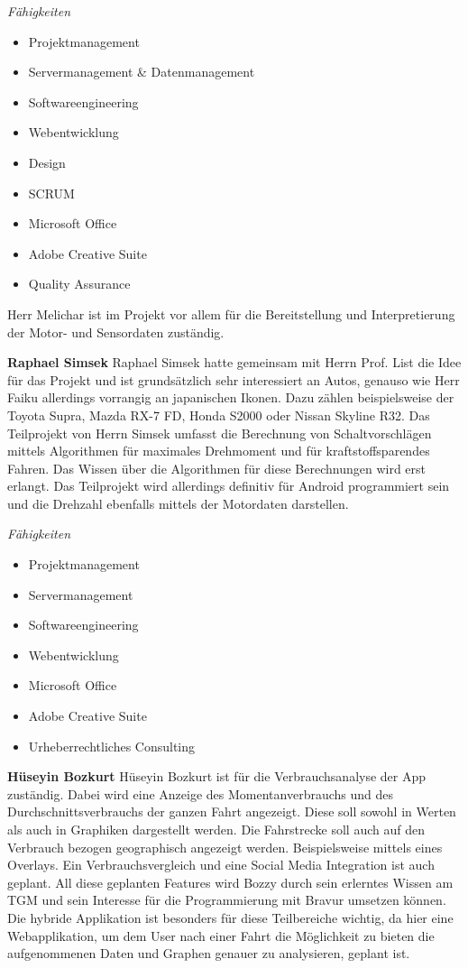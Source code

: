\textit{Fähigkeiten}
\begin{itemize}
	\item Projektmanagement
	\item Servermanagement & Datenmanagement				
	\item Softwareengineering
	\item Webentwicklung
	\item Design
	\item SCRUM
	\item Microsoft Office
	\item Adobe Creative Suite
	\item Quality Assurance
\end{itemize}
Herr Melichar ist im Projekt vor allem für die Bereitstellung und Interpretierung der Motor- und Sensordaten zuständig. 


\textbf{Raphael Simsek}
Raphael Simsek hatte gemeinsam mit Herrn Prof. List die Idee für das Projekt und ist grundsätzlich sehr interessiert an Autos, genauso wie Herr Faiku allerdings vorrangig an japanischen Ikonen. Dazu zählen beispielsweise der Toyota Supra, Mazda RX-7 FD, Honda S2000 oder Nissan Skyline R32. Das Teilprojekt von Herrn Simsek umfasst die Berechnung von Schaltvorschlägen mittels Algorithmen für maximales Drehmoment und für kraftstoffsparendes Fahren. Das Wissen über die Algorithmen für diese Berechnungen wird erst erlangt. Das Teilprojekt wird allerdings definitiv für Android programmiert sein und die Drehzahl ebenfalls mittels der Motordaten darstellen.

\textit{Fähigkeiten}
\begin{itemize}
	\item Projektmanagement
	\item Servermanagement				
	\item Softwareengineering
	\item Webentwicklung
	\item Microsoft Office
	\item Adobe Creative Suite
	\item Urheberrechtliches Consulting
\end{itemize}

\textbf{Hüseyin Bozkurt}
Hüseyin Bozkurt ist für die Verbrauchsanalyse der App zuständig. Dabei wird eine Anzeige des Momentanverbrauchs und des Durchschnittsverbrauchs der ganzen Fahrt angezeigt. Diese soll sowohl in Werten als auch in Graphiken dargestellt werden. Die Fahrstrecke soll auch auf den Verbrauch bezogen geographisch angezeigt werden. Beispielsweise mittels eines Overlays. Ein Verbrauchsvergleich und eine Social Media Integration ist auch geplant.
All diese geplanten Features wird Bozzy durch sein erlerntes Wissen am TGM und sein Interesse für die Programmierung mit Bravur umsetzen können. Die hybride Applikation ist besonders für diese Teilbereiche wichtig, da hier eine Webapplikation, um dem User nach einer Fahrt die Möglichkeit zu bieten die aufgenommenen Daten und Graphen genauer zu analysieren, geplant ist.


